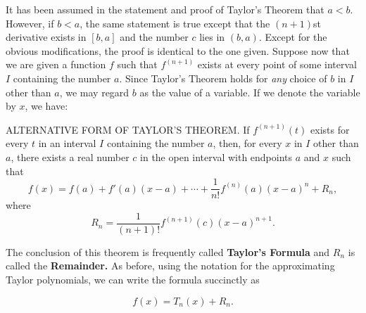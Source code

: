 It has been assumed in the statement and proof of Taylor's Theorem that $a < b$. However, if $b < a$, the same statement is true except that the $(n + 1)$st derivative exists in $[b, a]$ and the number $c$ lies in $(b, a)$. Except for the obvious modifications, the proof is identical to the one given. Suppose now that we are given a function $f$ such that $f^{(n+1)}$ exists at every point of some interval $I$ containing the number $a$. Since Taylor's Theorem holds for \textit{any} choice of $b$ in $I$ other than $a$, we may regard $b$ as the value of a variable. If we denote the variable by $x$, we have:

\begin{theorem} 
ALTERNATIVE FORM OF TAYLOR'S THEOREM. If $f^{(n+1)}(t)$ exists for every $t$ in an interval $I$ containing the number $a$, then, for every $x$ in $I$ other than $a$, there exists a real number $c$ in the open interval with endpoints $a$ and $x$ such that
$$
f(x) = f(a) + f'(a)(x-a) + \cdots + \frac{1}{n!} f^{(n)}(a)(x-a)^n + R_n, 
$$
\noindent where
$$
R_n = \frac{1}{(n+1)!} f^{(n+1)} (c) (x - a)^{n+1} .
$$
\end{theorem}

The conclusion of this theorem is frequently called \textbf{Taylor's Formula} and $R_n$ is called the \textbf{Remainder.} As before, using the notation for the approximating Taylor polynomials, we can write the formula succinctly as

\begin{equation}
f(x) = T_n(x) + R_n  . 
\label{eq9.8.3}
\end{equation}


